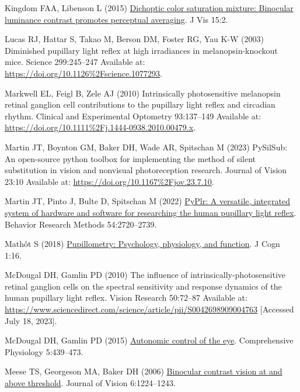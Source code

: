 \documentclass[
]{article}
\newlength{\cslhangindent}
\newenvironment{CSLReferences}[2] %
 {\begin{list}{}{%
  \setlength{\itemindent}{0pt}
  \setlength{\leftmargin}{0pt}
  \setlength{\parsep}{0pt}
  \ifodd #1
   \setlength{\leftmargin}{\cslhangindent}
   \setlength{\itemindent}{-1\cslhangindent}
  \fi
  \setlength{\itemsep}{#2\baselineskip}}}
 {\end{list}}
\begin{document}
\begin{CSLReferences}{1}{1}
Kingdom FAA, Libenson L (2015) \href{https://doi.org/10.1167/15.5.2}{Dichoptic color saturation mixture: Binocular luminance contrast promotes perceptual averaging}. J Vis 15:2.

Lucas RJ, Hattar S, Takao M, Berson DM, Foster RG, Yau K-W (2003) Diminished pupillary light reflex at high irradiances in melanopsin-knockout mice. Science 299:245--247 Available at: \url{https://doi.org/10.1126\%2Fscience.1077293}.

Markwell EL, Feigl B, Zele AJ (2010) Intrinsically photosensitive melanopsin retinal ganglion cell contributions to the pupillary light reflex and circadian rhythm. Clinical and Experimental Optometry 93:137--149 Available at: \url{https://doi.org/10.1111\%2Fj.1444-0938.2010.00479.x}.

Martin JT, Boynton GM, Baker DH, Wade AR, Spitschan M (2023) PySilSub: An open-source python toolbox for implementing the method of silent substitution in vision and nonvisual photoreception research. Journal of Vision 23:10 Available at: \url{https://doi.org/10.1167\%2Fjov.23.7.10}.

Martin JT, Pinto J, Bulte D, Spitschan M (2022) \href{https://doi.org/10.3758/s13428-021-01759-3}{PyPlr: A versatile, integrated system of hardware and software for researching the human pupillary light reflex}. Behavior Research Methods 54:2720--2739.

Mathôt S (2018) \href{https://doi.org/10.5334/joc.18}{Pupillometry: Psychology, physiology, and function}. J Cogn 1:16.

McDougal DH, Gamlin PD (2010) The influence of intrinsically-photosensitive retinal ganglion cells on the spectral sensitivity and response dynamics of the human pupillary light reflex. Vision Research 50:72--87 Available at: \url{https://www.sciencedirect.com/science/article/pii/S0042698909004763} {[}Accessed July 18, 2023{]}.

McDougal DH, Gamlin PD (2015) \href{https://doi.org/10.1002/cphy.c140014}{Autonomic control of the eye}. Comprehensive Physiology 5:439--473.

Meese TS, Georgeson MA, Baker DH (2006) \href{https://doi.org/10.1167/6.11.7}{Binocular contrast vision at and above threshold}. Journal of Vision 6:1224--1243.


\end{CSLReferences}
\end{document}
